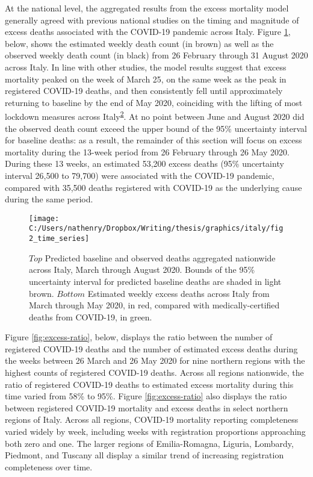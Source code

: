 \documentclass[
]{article}
\begin{document}
At the national level, the aggregated results from the excess mortality model generally agreed with previous national studies on the timing and magnitude of excess deaths associated with the COVID-19 pandemic across Italy. Figure \ref{fig:time-series}, below, shows the estimated weekly death count (in brown) as well as the observed weekly death count (in black) from 26 February through 31 August 2020 across Italy. In line with other studies, the model results suggest that excess mortality peaked on the week of March 25, on the same week as the peak in registered COVID-19 deaths, and then consistently fell until approximately returning to baseline by the end of May 2020, coinciding with the lifting of most lockdown measures across Italy\textsuperscript{\protect\hyperlink{ref-Alicandro2020}{2}}⁠. At no point between June and August 2020 did the observed death count exceed the upper bound of the 95\% uncertainty interval for baseline deaths: as a result, the remainder of this section will focus on excess mortality during the 13-week period from 26 February through 26 May 2020. During these 13 weeks, an estimated 53,200 excess deaths (95\% uncertainty interval 26,500 to 79,700) were associated with the COVID-19 pandemic, compared with 35,500 deaths registered with COVID-19 as the underlying cause during the same period.

\begin{figure}[!hbt]

{\centering \texttt{[image: C:/Users/nathenry/Dropbox/Writing/thesis/graphics/italy/fig2\_time\_series]} 

}

\caption{\(Top\) Predicted baseline and observed deaths aggregated nationwide across Italy, March through August 2020. Bounds of the 95\% uncertainty interval for predicted baseline deaths are shaded in light brown. \(Bottom\) Estimated weekly excess deaths across Italy from March through May 2020, in red, compared with medically-certified deaths from COVID-19, in green.}\label{fig:time-series}
\end{figure}

Figure \ref{fig:excess-ratio}, below, displays the ratio between the number of registered COVID-19 deaths and the number of estimated excess deaths during the weeks between 26 March and 26 May 2020 for nine northern regions with the highest counts of registered COVID-19 deaths. Across all regions nationwide, the ratio of registered COVID-19 deaths to estimated excess mortality during this time varied from 58\% to 95\%. Figure \ref{fig:excess-ratio} also displays the ratio between registered COVID-19 mortality and excess deaths in select northern regions of Italy. Across all regions, COVID-19 mortality reporting completeness varied widely by week, including weeks with registration proportions approaching both zero and one. The larger regions of Emilia-Romagna, Liguria, Lombardy, Piedmont, and Tuscany all display a similar trend of increasing registration completeness over time.
\end{document}
